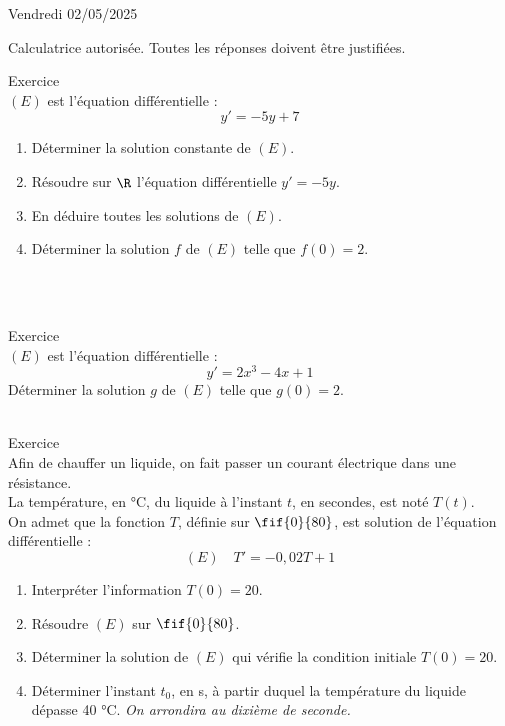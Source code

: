 \documentclass[a4paper,11pt,eval]{nsi}
\newcounter{exoNum}
\newcommand{\exo}[1]
{
	\addtocounter{exoNum}{1}
	{\titlefont\color{UGLiBlue}\Large Exercice\ \theexoNum\ \normalsize{#1}}\smallskip	
}
\begin{document}
\textcolor{UGLiBlue}{Vendredi 02/05/2025}\\
\maketitle
\begin{center}
	Calculatrice autorisée. Toutes les réponses doivent être justifiées.
\end{center}






\exo{}\\
$(E)$ est l'équation différentielle  : 
$$y'=-5y+7$$
\begin{enumerate}
    \item Déterminer la solution constante de $(E)$.
    \item Résoudre sur $\R$ l'équation différentielle $y'=-5y$.
    \item En déduire toutes les solutions de $(E)$.
    \item Déterminer la solution $f$ de $(E)$ telle que $f(0)=2$.
\end{enumerate}

\\
\\

\exo{}\\
$(E)$ est l'équation différentielle  : 
$$y'=2x^3-4x+1$$
Déterminer la solution $g$ de $(E)$ telle que $g(0)=2$.\\

\\



\exo{}\\
Afin de chauffer un liquide, on fait passer un courant électrique dans une résistance.\\
La température, en °C, du liquide à l'instant $t$, en secondes, est noté $T(t)$.\\
On admet que la fonction $T$, définie sur $\fif{0}{80}$, est solution de l'équation différentielle :
$$(E) \quad T'=-0{,}02T+1$$
\begin{enumerate}
    \item Interpréter l'information $T(0)=20$.
    \item Résoudre $(E)$ sur $\fif{0}{80}$.
    \item Déterminer la solution de $(E)$ qui vérifie la condition initiale $T(0)=20$.
    \item Déterminer l'instant $t_0$, en s, à partir duquel la température du liquide dépasse 40 °C. \textit{On arrondira au dixième de seconde.}
\end{enumerate}
\\
\end{document}
